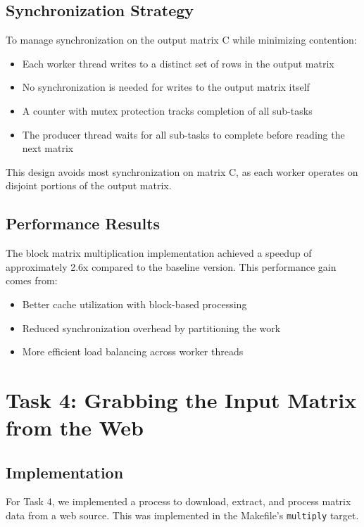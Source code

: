 \documentclass[11pt,a4paper]{article}
\begin{document}
\subsection{Synchronization Strategy}
To manage synchronization on the output matrix C while minimizing contention:

\begin{itemize}
    \item Each worker thread writes to a distinct set of rows in the output matrix
    \item No synchronization is needed for writes to the output matrix itself
    \item A counter with mutex protection tracks completion of all sub-tasks
    \item The producer thread waits for all sub-tasks to complete before reading the next matrix
\end{itemize}

This design avoids most synchronization on matrix C, as each worker operates on disjoint portions of the output matrix.

\subsection{Performance Results}
The block matrix multiplication implementation achieved a speedup of approximately 2.6x compared to the baseline version. This performance gain comes from:

\begin{itemize}
    \item Better cache utilization with block-based processing
    \item Reduced synchronization overhead by partitioning the work
    \item More efficient load balancing across worker threads
\end{itemize}

\section{Task 4: Grabbing the Input Matrix from the Web}

\subsection{Implementation}
For Task 4, we implemented a process to download, extract, and process matrix data from a web source. This was implemented in the Makefile's \texttt{multiply} target.
\end{document}
